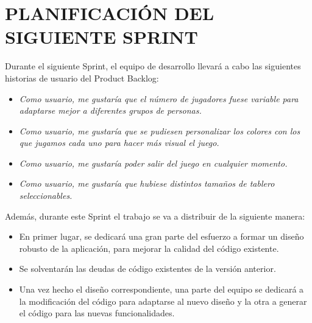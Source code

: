 \documentclass{article}
\begin{document}
\section{PLANIFICACIÓN DEL SIGUIENTE SPRINT}
Durante el siguiente Sprint, el equipo de desarrollo llevará a cabo las siguientes historias de usuario del Product Backlog:
\begin{itemize}
\item \textit{Como usuario, me gustaría que el número de jugadores fuese variable para adaptarse mejor a diferentes grupos de personas.}
\item \textit{Como usuario, me gustaría que se pudiesen personalizar los colores con los que jugamos cada uno para hacer más visual el juego.}
\item \textit{Como usuario, me gustaría poder salir del juego en cualquier momento.}
\item \textit{Como usuario, me gustaría que hubiese distintos tamaños de tablero seleccionables.}
\end{itemize}
Además, durante este Sprint el trabajo se va a distribuir de la siguiente manera:
\begin{itemize}
\item En primer lugar, se dedicará una gran parte del esfuerzo a formar un diseño robusto de la aplicación, para mejorar la calidad del código existente.
\item Se solventarán las deudas de código existentes de la versión anterior.
\item Una vez hecho el diseño correspondiente, una parte del equipo se dedicará a la modificación del código para adaptarse al nuevo diseño y la otra a generar el código para las nuevas funcionalidades.
\end{itemize}
\end{document}
